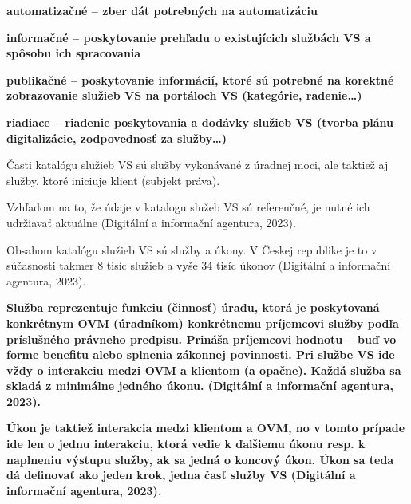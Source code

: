 \startitemize
\item{\start \bf automatizačné \stop – zber dát potrebných na automatizáciu}
\item{\start \bf informačné \stop – poskytovanie prehľadu o existujícich službách VS a spôsobu ich spracovania}
\item{\start \bf publikačné \stop – poskytovanie informácií, ktoré sú potrebné na korektné zobrazovanie služieb VS na portáloch VS (kategórie, radenie\dots)}
\item{\start \bf riadiace \stop – riadenie poskytovania a dodávky služieb VS (tvorba plánu digitalizácie, zodpovednosť za služby\dots)}
\stopitemize

Časti katalógu služieb VS sú služby vykonávané z úradnej moci, ale taktiež aj služby, ktoré iniciuje klient (subjekt práva). 


%

Vzhľadom na to, že údaje v katalogu služeb VS sú referenčné, je nutné ich udržiavať aktuálne \scr(Digitální a informační agentura, 2023).

Obsahom katalógu služieb VS sú služby a úkony. V Českej republike je to v súčasnosti takmer 8 tisíc služieb a vyše 34 tisíc úkonov \scr(Digitální a informační agentura, 2023).

\start\bf Služba \stop reprezentuje funkciu (činnosť) úradu, ktorá je poskytovaná konkrétnym OVM (úradníkom) konkrétnemu príjemcovi služby podľa príslušného právneho predpisu. Prináša príjemcovi hodnotu -- buď vo forme benefitu alebo splnenia zákonnej povinnosti. Pri službe VS ide vždy o interakciu medzi OVM a klientom (a opačne). Každá služba sa skladá z minimálne jedného úkonu. \scr(Digitální a informační agentura, 2023).

\start \bf Úkon \stop je taktiež interakcia medzi klientom a OVM, no v tomto prípade ide len o jednu interakciu, ktorá vedie k ďalšiemu úkonu resp. k naplneniu výstupu služby, ak sa jedná o koncový úkon. Úkon sa teda dá definovať ako jeden krok, jedna časť služby VS \scr(Digitální a informační agentura, 2023).



